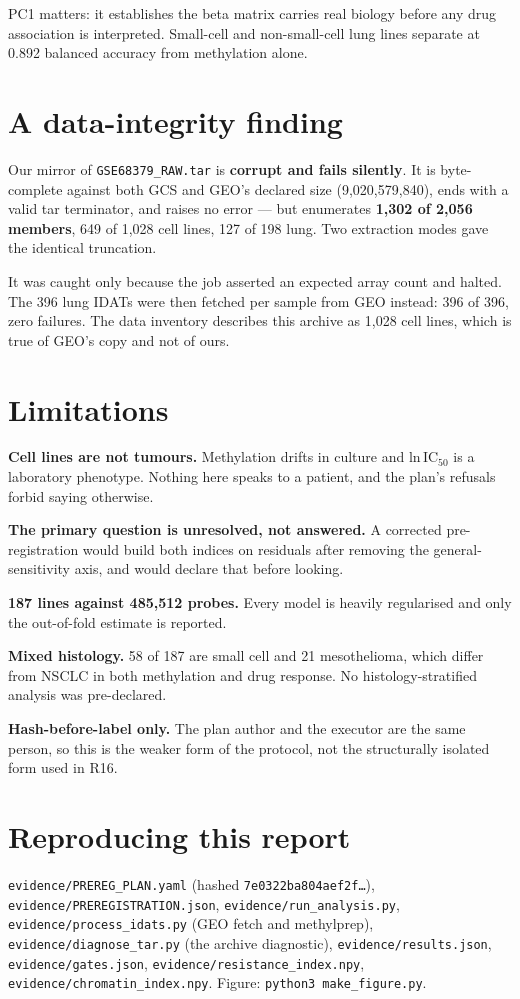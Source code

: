 \documentclass[11pt,a4paper]{article}
\begin{document}
PC1 matters: it establishes the beta matrix carries real biology before any drug association is
interpreted. Small-cell and non-small-cell lung lines separate at 0.892 balanced accuracy from
methylation alone.

\section{A data-integrity finding}

Our mirror of \texttt{GSE68379\_RAW.tar} is \textbf{corrupt and fails silently}. It is
byte-complete against both GCS and GEO's declared size (9{,}020{,}579{,}840), ends with a valid tar
terminator, and raises no error --- but enumerates \textbf{1{,}302 of 2{,}056 members}, 649 of
1{,}028 cell lines, 127 of 198 lung. Two extraction modes gave the identical truncation.

It was caught only because the job asserted an expected array count and halted. The 396 lung IDATs
were then fetched per sample from GEO instead: 396 of 396, zero failures. The data inventory
describes this archive as 1{,}028 cell lines, which is true of GEO's copy and not of ours.

\section{Limitations}

\textbf{Cell lines are not tumours.} Methylation drifts in culture and ln\,IC$_{50}$ is a
laboratory phenotype. Nothing here speaks to a patient, and the plan's refusals forbid saying
otherwise.

\textbf{The primary question is unresolved, not answered.} A corrected pre-registration would
build both indices on residuals after removing the general-sensitivity axis, and would declare that
before looking.

\textbf{187 lines against 485{,}512 probes.} Every model is heavily regularised and only the
out-of-fold estimate is reported.

\textbf{Mixed histology.} 58 of 187 are small cell and 21 mesothelioma, which differ from NSCLC in
both methylation and drug response. No histology-stratified analysis was pre-declared.

\textbf{Hash-before-label only.} The plan author and the executor are the same person, so this is
the weaker form of the protocol, not the structurally isolated form used in R16.

\section*{Reproducing this report}

\texttt{evidence/PREREG\_PLAN.yaml} (hashed \texttt{7e0322ba804aef2f\ldots}),
\texttt{evidence/PREREGISTRATION.json}, \texttt{evidence/run\_analysis.py},
\texttt{evidence/process\_idats.py} (GEO fetch and methylprep),
\texttt{evidence/diagnose\_tar.py} (the archive diagnostic),
\texttt{evidence/results.json}, \texttt{evidence/gates.json},
\texttt{evidence/resistance\_index.npy}, \texttt{evidence/chromatin\_index.npy}.
Figure: \texttt{python3 make\_figure.py}.
\end{document}
